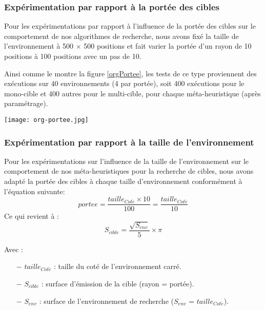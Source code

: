 \subsubsection{Expérimentation par rapport à la portée des cibles}
Pour les expérimentations par rapport à l'influence de la portée des cibles sur le comportement de nos algorithmes de recherche, nous avons fixé la taille de l'environnement à 500 $\times$ 500 positions et fait varier la portée d'un rayon de 10 positions à 100 positions avec un pas de 10.

Ainsi comme le montre la figure \ref{orgPortee}, les tests de ce type proviennent des exécutions sur 40 environnements (4 par portée), soit 400 exécutions pour le mono-cible et 400 autres pour le multi-cible, pour chaque méta-heuristique (après paramétrage).

\begin{center}	 
	\captionsetup{width=1\linewidth} 
	\texttt{[image: org-portee.jpg]}%
	\vspace{-0.1 cm}
	\label{orgPortee}%
\end{center}

\subsubsection{Expérimentation par rapport à la taille de l'environnement}
Pour les expérimentations sur l'influence de la taille de l'environnement sur le comportement de nos méta-heuristiques pour la recherche de cibles, nous avons adapté la portée des cibles à chaque taille d'environnement conformément à l'équation suivante:
\begin{equation}
portee = \frac{taille_{Cot\acute{e}} \times 10}{100} = \frac{taille_{Cot\acute{e}}}{10}
\label{porteeEnv}
\end{equation}	
Ce qui revient à :
\begin{equation}	
S_{cible} = \frac{\sqrt{S_{env}}}{5} \times \pi
\end{equation}

Avec :
\begin{itemize}
	\item[$-$] $taille_{Cot\acute{e}}$ : taille du coté de l'environnement carré.
	\item[$-$] $S_{cible}$ : surface d'émission de la cible (rayon = portée).
	\item[$-$] $S_{env}$ : surface de l'environnement de recherche ($S_{env}$ = $taille_{Cot\acute{e}}$).\\
\end{itemize}


